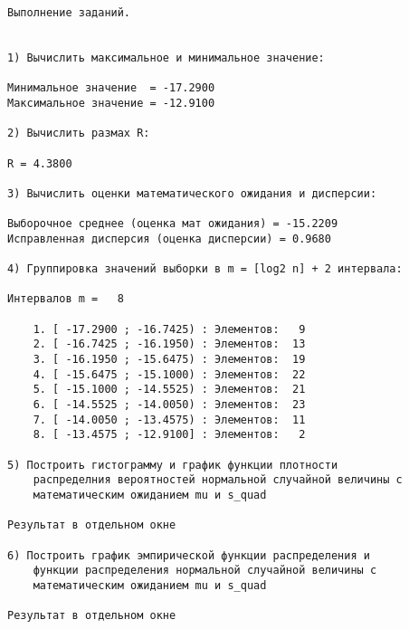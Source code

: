 \begin{lstlisting}
Выполнение заданий.


1) Вычислить максимальное и минимальное значение:

Минимальное значение  = -17.2900
Максимальное значение = -12.9100

2) Вычислить размах R:

R = 4.3800

3) Вычислить оценки математического ожидания и дисперсии:

Выборочное среднее (оценка мат ожидания) = -15.2209
Исправленная дисперсия (оценка дисперсии) = 0.9680

4) Группировка значений выборки в m = [log2 n] + 2 интервала:

Интервалов m =   8

    1. [ -17.2900 ; -16.7425) : Элементов:   9
    2. [ -16.7425 ; -16.1950) : Элементов:  13
    3. [ -16.1950 ; -15.6475) : Элементов:  19
    4. [ -15.6475 ; -15.1000) : Элементов:  22
    5. [ -15.1000 ; -14.5525) : Элементов:  21
    6. [ -14.5525 ; -14.0050) : Элементов:  23
    7. [ -14.0050 ; -13.4575) : Элементов:  11
    8. [ -13.4575 ; -12.9100] : Элементов:   2

5) Построить гистограмму и график функции плотности
    распределния вероятностей нормальной случайной величины с
    математическим ожиданием mu и s_quad

Результат в отдельном окне

6) Построить график эмпирической функции распределения и
    функции распределения нормальной случайной величины с
    математическим ожиданием mu и s_quad

Результат в отдельном окне
\end{lstlisting}


